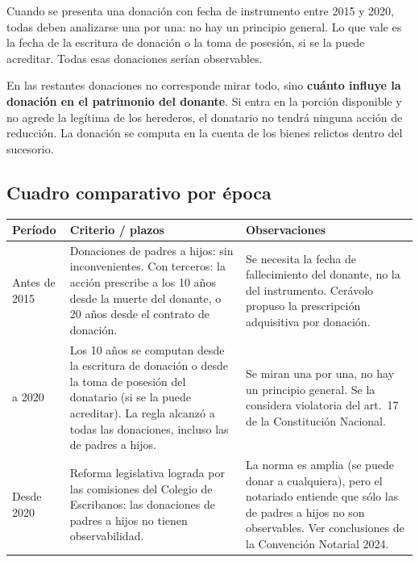 \documentclass[12pt,oneside]{book}
\begin{document}
Cuando se presenta una donación con fecha de instrumento entre 2015 y 2020, todas deben analizarse una por una: no hay un principio general. Lo que vale es la fecha de la escritura de donación o la toma de posesión, si se la puede acreditar. Todas esas donaciones serían observables.

En las restantes donaciones no corresponde mirar todo, sino \textbf{cuánto influye la donación en el patrimonio del donante}. Si entra en la porción disponible y no agrede la legítima de los herederos, el donatario no tendrá ninguna acción de reducción. La donación se computa en la cuenta de los bienes relictos dentro del sucesorio.

\subsection{Cuadro comparativo por época}

\begin{center}
\small
\begin{tabularx}{\textwidth}{
    >{\raggedright\arraybackslash}p{}
    >{\raggedright\arraybackslash}X
    >{\raggedright\arraybackslash}X
}
\toprule
\textbf{Período} & \textbf{Criterio / plazos} & \textbf{Observaciones} \\
\midrule
Antes de 2015 &
Donaciones de padres a hijos: sin inconvenientes. Con terceros: la acción prescribe a los 10 años desde la muerte del donante, o 20 años desde el contrato de donación. &
Se necesita la fecha de fallecimiento del donante, no la del instrumento. Cerávolo propuso la prescripción adquisitiva por donación. \\
\addlinespace
2015 a 2020 &
Los 10 años se computan desde la escritura de donación o desde la toma de posesión del donatario (si se la puede acreditar). La regla alcanzó a todas las donaciones, incluso las de padres a hijos. &
Se miran una por una, no hay un principio general. Se la considera violatoria del art.~17 de la Constitución Nacional. \\
\addlinespace
Desde 2020 &
Reforma legislativa lograda por las comisiones del Colegio de Escribanos: las donaciones de padres a hijos no tienen observabilidad. &
La norma es amplia (se puede donar a cualquiera), pero el notariado entiende que sólo las de padres a hijos no son observables. Ver conclusiones de la Convención Notarial 2024. \\
\bottomrule
\end{tabularx}
\end{center}
\end{document}
